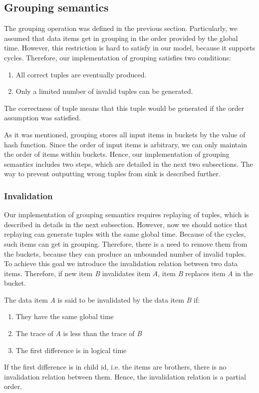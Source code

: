 
\label  {fs-implementation-section}

\subsection{Grouping semantics}
The grouping operation was defined in the previous section. Particularly, we assumed that data items get in grouping in the order provided by the global time. However, this restriction is hard to satisfy in our model, because it supports cycles. Therefore, our implementation of grouping satisfies two conditions:

\begin{enumerate}
\item All correct tuples are eventually produced.
\item Only a limited number of invalid tuples can be generated.
\end{enumerate}

The correctness of tuple means that this tuple would be generated if the order assumption was satisfied. 

As it was mentioned, grouping stores all input items in buckets by the value of hash function. Since the order of input items is arbitrary, we can only maintain the order of items within buckets. Hence, our implementation of grouping semantics includes two steps, which are detailed in the next two subsections. The way to prevent outputting wrong tuples from sink is described further.

\subsubsection{Invalidation}
Our implementation of grouping semantics requires replaying of tuples, which is described in details in the next subsection. However, now we should notice that replaying can generate tuples with the same global time. Because of the cycles, such items can get in grouping. Therefore, there is a need to remove them from the buckets, because they can produce an unbounded number of invalid tuples. To achieve this goal we introduce the invalidation relation between two data items. Therefore, if new item {\it B} invalidates item {\it A}, item {\it B} replaces item {\it A} in the bucket.

The data item {\it A} is said to be invalidated by the data item {\it B} if:
\begin{enumerate}
\item They have the same global time
\item The trace of {\it A} is less than the trace of {\it B}
\item The first difference is in logical time
\end{enumerate}
If the first difference is in child id, i.e. the items are brothers, there is no invalidation relation between them. Hence, the invalidation relation is a partial order.

